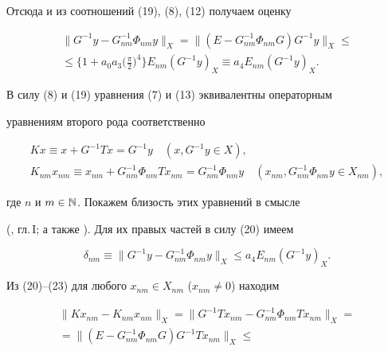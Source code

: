 \begin{pf}
Отсюда и из соотношений (19), (8), (12) получаем оценку 


\begin{multline} 


\|G^{-1}y-G^{-1}_{nm}\Phi_{nm}y\|_X=\|(E-G^{-1}_{nm} 


\Phi_{nm}G)G^{-1}y\|_X\le \\ 


% 


\le\bigg\{1+a_0a_3\bigg(\frac{\pi}{2}\bigg)^4\bigg\} 


E_{nm}(G^{-1}y)_X\equiv a_4E_{nm}(G^{-1}y)_X. 


\end{multline} 


В силу (8) и (19) уравнения (7) и (13) эквивалентны операторным 


уравнениям второго рода соответственно 


\begin{gather} 


K x\equiv x+G^{-1}T x=G^{-1}y\quad (x,G^{-1}y\in X),\\ 


% 


K_{nm}x_{nm}\equiv x_{nm}+G^{-1}_{nm}\Phi_{nm}T x_{nm}= 


G^{-1}_{nm}\Phi_{nm}y\quad (x_{nm},G^{-1}_{nm}\Phi_{nm}y\in X_{nm}), 


\end{gather} 


где $n$ и $m\in\Bbb N$. Покажем близость этих уравнений в смысле 


(\cite{9}, гл.\,I; а также \cite{10}). Для их правых частей в силу (20) имеем 


\begin{equation} 


\delta_{nm}\equiv\|G^{-1}y-G^{-1}_{nm}\Phi_{nm}y\|_X\le 


a_4E_{nm}(G^{-1}y)_X. 


\end{equation} 


Из (20)--(23) для любого $x_{nm}\in X_{nm}$ ($x_{nm}\ne0$) находим 


\begin{multline} 


\|K x_{nm}-K_{nm}x_{nm}\|_X=\|G^{-1}T x_{nm}- 


G^{-1}_{nm}\Phi_{nm}T x_{nm}\|_X= \\ 


% 


=\|(E-G^{-1}_{nm}\Phi_{nm}G)G^{-1}T x_{nm}\|_X\le 



\end{multline}
\end{pf}
